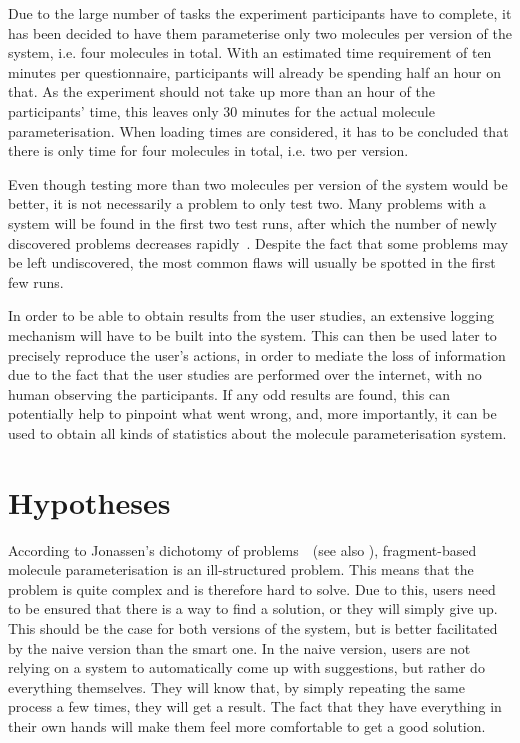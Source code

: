 Due to the large number of tasks the experiment participants have to complete, it has been decided to have them parameterise only two molecules per version of the system, i.e. four molecules in total. With an estimated time requirement of ten minutes per questionnaire, participants will already be spending half an hour on that. As the experiment should not take up more than an hour of the participants' time, this leaves only 30 minutes for the actual molecule parameterisation. When loading times are considered, it has to be concluded that there is only time for four molecules in total, i.e. two per version.

Even though testing more than two molecules per version of the system would be better, it is not necessarily a problem to only test two. Many problems with a system will be found in the first two test runs, after which the number of newly discovered problems decreases rapidly~\cite{krug2006dont}. Despite the fact that some problems may be left undiscovered, the most common flaws will usually be spotted in the first few runs.

In order to be able to obtain results from the user studies, an extensive logging mechanism will have to be built into the system. This can then be used later to precisely reproduce the user's actions, in order to mediate the loss of information due to the fact that the user studies are performed over the internet, with no human observing the participants. If any odd results are found, this can potentially help to pinpoint what went wrong, and, more importantly, it can be used to obtain all kinds of statistics about the molecule parameterisation system.



\section{Hypotheses}
According to Jonassen's dichotomy of problems~\cite{jonassen2000toward}~(see also ), fragment-based molecule parameterisation is an ill-structured problem. This means that the problem is quite complex and is therefore hard to solve. Due to this, users need to be ensured that there is a way to find a solution, or they will simply give up. This should be the case for both versions of the system, but is better facilitated by the naive version than the smart one. In the naive version, users are not relying on a system to automatically come up with suggestions, but rather do everything themselves. They will know that, by simply repeating the same process a few times, they will get a result. The fact that they have everything in their own hands will make them feel more comfortable to get a good solution.

